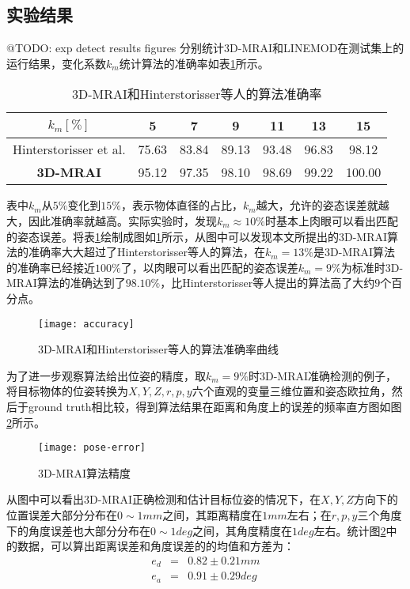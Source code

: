 \subsection{实验结果}
@TODO: exp detect results figures
分别统计3D-MRAI和LINEMOD在测试集上的运行结果，变化系数$k_m$统计算法的准确率如表\ref{tab:mrai}所示。
\begin{table}[ht]
  \centering
  \begin{tabular}{ccccccc}
    \toprule
    $k_m[\%]$&5&7&9&11&13&15\\
    \midrule
    Hinterstorisser et al.&75.63& 83.84& 89.13& 93.48& 96.83&98.12\\
    \bf{3D-MRAI}&95.12& 97.35& 98.10& 98.69& 99.22& 100.00\\
    \bottomrule
  \end{tabular}
  \caption{3D-MRAI和Hinterstorisser等人的算法准确率}
  \label{tab:mrai}
\end{table}
表中$k_m$从$5\%$变化到$15\%$，表示物体直径的占比，$k_m$越大，允许的姿态误差就越大，因此准确率就越高。实际实验时，发现$k_m\approx 10\%$时基本上肉眼可以看出匹配的姿态误差。将表\ref{tab:mrai}绘制成图如\ref{fig:mrai}所示，从图中可以发现本文所提出的3D-MRAI算法的准确率大大超过了Hinterstorisser等人的算法，在$k_m=13\%$是3D-MRAI算法的准确率已经接近$100\%$了，以肉眼可以看出匹配的姿态误差$k_m=9\%$为标准时3D-MRAI算法的准确达到了$98.10\%$，比Hinterstorisser等人提出的算法高了大约$9$个百分点。
\begin{figure}[ht]
  \centering
  \texttt{[image: accuracy]}
  \caption{3D-MRAI和Hinterstorisser等人的算法准确率曲线}
  \label{fig:mrai}
\end{figure}

为了进一步观察算法给出位姿的精度，取$k_m=9\%$时3D-MRAI准确检测的例子，将目标物体的位姿转换为$X,Y,Z,r,p,y$六个直观的变量三维位置和姿态欧拉角，然后于ground truth相比较，得到算法结果在距离和角度上的误差的频率直方图如图\ref{fig:pose-error}所示。
\begin{figure}[ht]
  \centering
  \texttt{[image: pose-error]}
  \caption{3D-MRAI算法精度}
  \label{fig:pose-error}
\end{figure}
从图中可以看出3D-MRAI正确检测和估计目标位姿的情况下，在$X,Y,Z$方向下的位置误差大部分分布在$0\sim 1mm$之间，其距离精度在$1mm$左右；在$r,p,y$三个角度下的角度误差也大部分分布在$0\sim 1deg$之间，其角度精度在$1deg$左右。统计图\ref{fig:pose-error}中的数据，可以算出距离误差和角度误差的的均值和方差为：
\begin{equation}
  \begin{array}{ccc}
    e_d &=& 0.82\pm0.21mm\\
    e_a &=& 0.91\pm0.29deg
  \end{array}
\end{equation}

